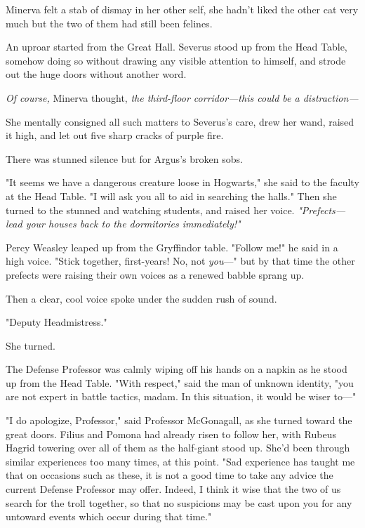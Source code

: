 Minerva felt a stab of dismay in her other self, she hadn't liked the other cat 
very much but the two of them had still been felines.

An uproar started from the Great Hall. Severus stood up from the Head Table, 
somehow doing so without drawing any visible attention to himself, and strode 
out the huge doors without another word.

\emph{Of course,} Minerva thought, \emph{the third-floor corridor---this could 
be a distraction---}

She mentally consigned all such matters to Severus's care, drew her wand, 
raised it high, and let out five sharp cracks of purple fire.

There was stunned silence but for Argus's broken sobs.

"It seems we have a dangerous creature loose in Hogwarts," she said to the 
faculty at the Head Table. "I will ask you all to aid in searching the halls." 
Then she turned to the stunned and watching students, and raised her voice. 
\emph{"Prefects---lead your houses back to the dormitories immediately!"}

Percy Weasley leaped up from the Gryffindor table. "Follow me!" he said in a 
high voice. "Stick together, first-years! No, not \emph{you}---" but by that 
time the other prefects were raising their own voices as a renewed babble 
sprang up.

Then a clear, cool voice spoke under the sudden rush of sound.

"Deputy Headmistress."

She turned.

The Defense Professor was calmly wiping off his hands on a napkin as he stood 
up from the Head Table. "With respect," said the man of unknown identity, "you 
are not expert in battle tactics, madam. In this situation, it would be wiser 
to---"

"I do apologize, Professor," said Professor McGonagall, as she turned toward 
the great doors. Filius and Pomona had already risen to follow her, with Rubeus 
Hagrid towering over all of them as the half-giant stood up. She'd been through 
similar experiences too many times, at this point. "Sad experience has taught 
me that on occasions such as these, it is not a good time to take any advice 
the current Defense Professor may offer. Indeed, I think it wise that the two 
of us search for the troll together, so that no suspicions may be cast upon you 
for any untoward events which occur during that time."

